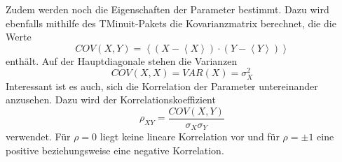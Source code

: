 Zudem werden noch die Eigenschaften der Parameter bestimmt. Dazu wird ebenfalls mithilfe des TMinuit-Pakets die Kovarianzmatrix berechnet, die die Werte
\begin{equation}
COV(X,Y)=\left<\left(X-\left<X\right>\right)\cdot\left(Y-\left<Y\right>\right)\right>
\end{equation}
enthält. Auf der Hauptdiagonale stehen die Varianzen
\begin{equation}
COV(X,X)=VAR(X)=\sigma_X^2
\end{equation}
Interessant ist es auch, sich die Korrelation der Parameter untereinander anzusehen. Dazu wird der Korrelationskoeffizient 
\begin{equation}
\rho_{XY}=\frac{COV(X,Y)}{\sigma_X\sigma_Y}
\end{equation}
verwendet. Für $\rho=0$ liegt keine lineare Korrelation vor und für $\rho=\pm1$ eine positive beziehungsweise eine negative Korrelation.

